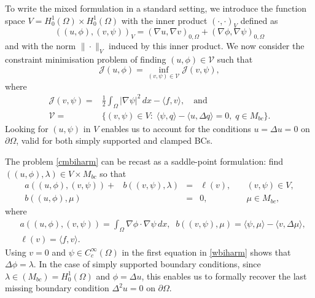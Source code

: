 \documentclass[a4paper,final]{siamltex}
\newcommand{\CV}{\mathcal{V}}
\newcommand{\CJ}{\mathcal{J}}
\newcommand{\M}{{M_{bc}}}
\newcommand{\Mb}{{(M_{bc})}}
\begin{document}
To write the mixed formulation in a standard setting, we introduce 
the function space 
$V =H^1_0(\Omega)\times H_0^1(\Omega)$  with the inner product $(\cdot,\cdot)_{V}$ 
defined as \[ ((u,\phi),(v,\psi))_{V} =(\nabla u,\nabla v)_{0,\Omega}+ 
(\nabla \phi,\nabla \psi)_{0,\Omega}\] 
 and with the norm $\|\cdot\|_{V}$ induced by this inner product. 
We now consider the constraint minimisation problem of finding $(u,\phi) \in \CV$  such that 
\begin{equation}\label{cmbiharm}
\CJ(u,\phi)=\inf_{(v,\psi) \in \CV}\CJ(v,\psi),
\end{equation}
where 
\begin{equation}\label{def:CV}
\begin{aligned}
\CJ(v,\psi)={}&\frac{1}{2} \int_{\Omega}|\nabla \psi|^2\,dx-\langle f,v\rangle,\quad\text{and}\\ 
\CV={}&\{(v,\psi)\in V:\;\langle\psi,q\rangle-\langle u, \Delta q \rangle=0,\;
q \in \M\}.
\end{aligned}
\end{equation}
Looking for $(u,\psi)$ in $V$ enables us to account for the conditions
$u=\Delta u=0$ on $\partial\Omega$, valid for both simply supported and clamped BCs.

The problem \eqref{cmbiharm} can be recast as 
a saddle-point formulation: 
find $((u,\phi),\lambda) \in V \times \M$ so that 
\begin{equation}\label{wbiharm}
\begin{array}{llccc}
a((u,\phi),(v,\psi))+&b((v,\psi),\lambda)&=&\ell(v),&\quad (v,\psi) \in  V, \\
b((u,\phi),\mu)&&=&0,&\quad \mu\in \M,
\end{array}
\end{equation}
where
\begin{equation}\label{defbiharm}
\begin{aligned}
&a((u,\phi),(v,\psi))=\int_{\Omega}\nabla\phi\cdot \nabla \psi\,dx,\;\;
b((v,\psi),\mu)=\langle \psi,\mu\rangle-\langle v, \Delta \mu \rangle,\\
&\ell(v)=\langle f,v\rangle.
\end{aligned}
\end{equation}
Using $v=0$ and $\psi\in C^\infty_c(\Omega)$ in the first equation in \eqref{wbiharm}
shows that $\Delta \phi=\lambda$. In the case of simply supported boundary conditions, since
$\lambda\in \Mb=H^1_0(\Omega)$ and $\phi=\Delta u$, this enables us to formally recover the last
missing boundary condition $\Delta^2u=0$ on $\partial \Omega$.
\end{document}
